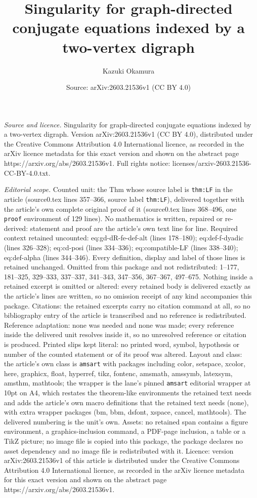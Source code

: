 \documentclass[10pt,a4paper]{amsart}
\title[Singularity for graph-directed conjugate equations indexed b]{Singularity for graph-directed conjugate equations indexed by a two-vertex digraph}
\author{Kazuki Okamura}
\date{Source: arXiv:2603.21536v1 (CC BY 4.0)}
\begin{document}
\maketitle

\noindent\emph{Source and licence.} Singularity for graph-directed conjugate equations indexed by a two-vertex digraph. Version arXiv:2603.21536v1 (CC BY 4.0), distributed under the Creative Commons Attribution 4.0 International licence, as recorded in the arXiv licence metadata for this exact version and shown on the abstract page https://arxiv.org/abs/2603.21536v1. Full rights notice: licenses/arxiv-2603.21536-CC-BY-4.0.txt.\par\smallskip

\noindent\textit{Editorial scope.} Counted unit: the Thm whose source label is \texttt{thm:LF} in the article (source0.tex lines 357--366, source label \texttt{thm:LF}), delivered together with the article's own complete original proof of it (source0.tex lines 368--496, one \texttt{proof} environment of 129 lines). No mathematics is written, repaired or re-derived: statement and proof are the article's own text line for line. Required context retained uncounted: eq:gd-dR-fe-def-alt (lines 178--180); eq:def-f-dyadic (lines 326--328); eq:cd-posi (lines 334--336); eq:compatible-LF (lines 338--340); eq:def-alpha (lines 344--346). Every definition, display and label of those lines is retained unchanged. Omitted from this package and not redistributed: 1--177, 181--325, 329--333, 337--337, 341--343, 347--356, 367--367, 497--675. Nothing inside a retained excerpt is omitted or altered: every retained body is delivered exactly as the article's lines are written, so no omission receipt of any kind accompanies this package. Citations: the retained excerpts carry no citation command at all, so no bibliography entry of the article is transcribed and no reference is redistributed. Reference adaptation: none was needed and none was made; every reference inside the delivered unit resolves inside it, so no unresolved reference or citation is produced. Printed slips kept literal: no printed word, symbol, hypothesis or number of the counted statement or of its proof was altered. Layout and class: the article's own class is \texttt{amsart} with packages including color, setspace, xcolor, here, graphicx, float, hyperref, tikz, fontenc, amsmath, amssymb, latexsym, amsthm, mathtools; the wrapper is the lane's pinned \texttt{amsart} editorial wrapper at 10pt on A4, which restates the theorem-like environments the retained text needs and adds the article's own macro definitions that the retained text needs (none), with extra wrapper packages (bm, bbm, dsfont, xspace, cancel, mathtools). The delivered numbering is the unit's own. Assets: no retained span contains a figure environment, a graphics-inclusion command, a PDF-page inclusion, a table or a TikZ picture; no image file is copied into this package, the package declares no asset dependency and no image file is redistributed with it. Licence: version arXiv:2603.21536v1 of this article is distributed under the Creative Commons Attribution 4.0 International licence, as recorded in the arXiv licence metadata for this exact version and shown on the abstract page https://arxiv.org/abs/2603.21536v1. 
\end{document}
